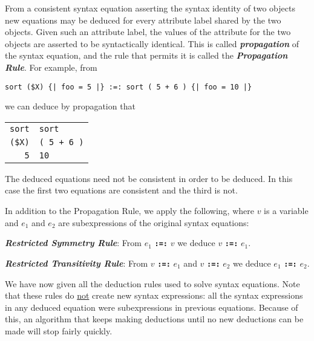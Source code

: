 \documentclass[12pt]{article}
\newcommand{\TT}[1]{{\tt \bfseries #1}}
\newcommand{\key}[1]{{\bf \em #1}\index{#1}}
\newcommand{\ikey}[2]{{\bf \em #1}\index{#2}}
\newenvironment{indpar}[1][0.3in]%
	{\begin{list}{}%
		     {\setlength{\itemsep}{0in}%
		      \setlength{\topsep}{0in}%
		      \setlength{\parsep}{1ex}%
		      \setlength{\labelwidth}{#1}%
		      \setlength{\leftmargin}{#1}%
		      \addtolength{\leftmargin}{\labelsep}}%
	 \item}%
	{\end{list}}
\begin{document}
From a consistent syntax equation asserting the syntax identity
of two objects new equations may be deduced for every attribute
label shared by the two objects.
Given such an attribute label, the values
of the attribute for the two objects are asserted to be syntactically
identical.  This is called \key{propagation}
of the syntax equation, and the rule that permits it is called
the \ikey{Propagation Rule}{propagation rule}\label{PROPAGATION-RULE}.
For example, from

\begin{center}
\verb/sort ($X) {| foo = 5 |} :=: sort ( 5 + 6 ) {| foo = 10 |}/
\end{center}

we can deduce by propagation that

\begin{center}
\begin{tabular}{r@\TT{~:=:~}l}
\verb/sort/ & \verb/sort/ \\
\verb/($X)/ & \verb/( 5 + 6 )/ \\
\verb/5/ & \verb/10/
\end{tabular}
\end{center}

The deduced equations need not be consistent in order to be deduced.
In this case the first two equations are consistent and the third is not.

In addition to the Propagation Rule, we apply the following, where
$v$ is a variable and $e_1$ and $e_2$ are subexpressions of the original
syntax equations:

\begin{indpar}
\begin{list}{}{}
\item [\ikey{Restricted Symmetry Rule}{restricted!symmetry rule}:]%
\label{RESTRICTED-SYMMETRY-RULE}
From $e_1$ \TT{:=:} $v$ we deduce $v$ \TT{:=:} $e_1$.

\item [\ikey{Restricted Transitivity Rule}{restricted!transitivity rule}:]%
\label{RESTRICTED-TRANSITIVITY-RULE}
From $v$ \TT{:=:} $e_1$ and $v$ \TT{:=:} $e_2$
we deduce $e_1$ \TT{:=:} $e_2$.
\end{list}
\end{indpar}

We have now given all the deduction rules used to solve syntax equations.
Note that these rules do \underline{not} create new syntax expressions:
all the syntax expressions in any deduced equation were subexpressions
in previous equations.  Because of this,
an algorithm that keeps making deductions until
no new deductions can be made will stop fairly quickly.
\end{document}
